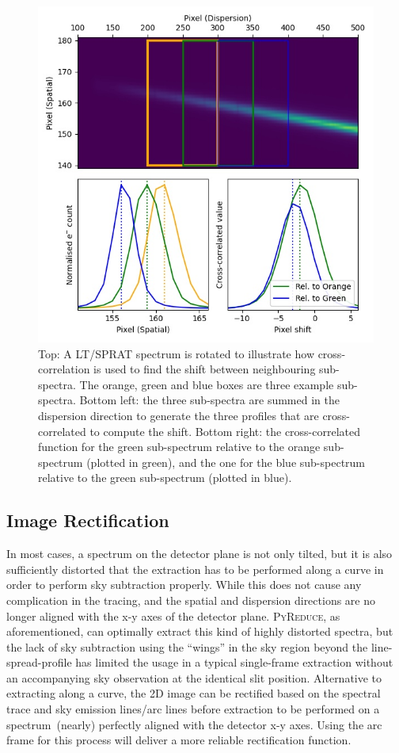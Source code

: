 \documentclass[fleqn,usenatbib]{mnras}
\begin{document}
\begin{figure}
    \centering
    \includegraphics[width=\columnwidth]{fig_01_tracing.jpg}
    \caption{Top: A LT/SPRAT spectrum is rotated to illustrate how
    cross-correlation is used to find the shift between neighbouring
    sub-spectra. The orange, green and blue boxes are three example
    sub-spectra. Bottom left: the three sub-spectra are summed in
    the dispersion direction to generate the three profiles that are
    cross-correlated to compute the shift. Bottom right: the
    cross-correlated function for the green sub-spectrum relative
    to the orange sub-spectrum (plotted in green), and the one
    for the blue sub-spectrum relative to the green sub-spectrum
    (plotted in blue).}
    \label{fig:trace}
\end{figure}


\subsection{Image Rectification}
In most cases, a spectrum on the detector plane is not only tilted,
but it is also sufficiently distorted that the extraction has to be
performed along a curve in order to perform sky subtraction properly.
While this does not cause any complication in the tracing, and the
spatial and dispersion directions are no longer aligned with the x-y
axes of the detector plane. \textsc{PyReduce}, as aforementioned,
can optimally extract this kind of highly distorted spectra, but the
lack of sky subtraction using the ``wings'' in the sky region beyond
the line-spread-profile has limited the usage in a typical single-frame
extraction without an accompanying sky observation at the identical
slit position. Alternative to extracting along a curve, the 2D image
can be rectified based on the spectral trace and sky emission
lines/arc lines before extraction to be performed on a spectrum~(nearly)
perfectly aligned with the detector x-y axes. Using the arc frame for
this process will deliver a more reliable rectification function.
\end{document}
